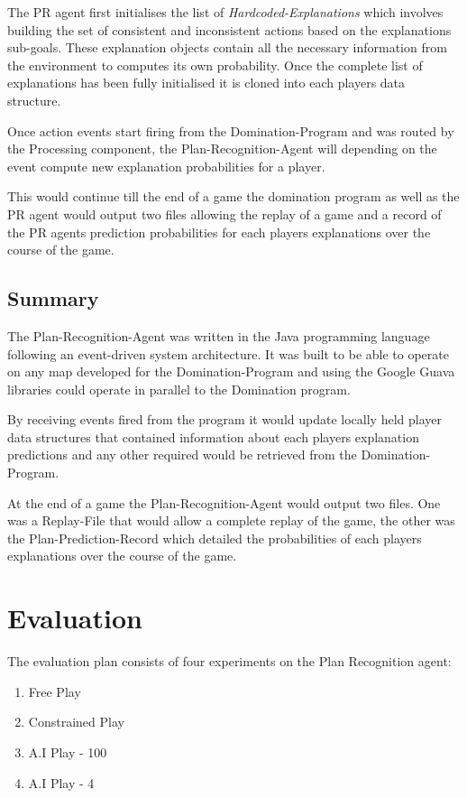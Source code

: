 \documentclass[parskip]{cs4rep}
\begin{document}
The PR agent first initialises the list of \textit{Hardcoded-Explanations} which involves building the set of consistent and inconsistent actions based on the explanations sub-goals. These explanation objects contain all the necessary information from the environment to computes its own probability. Once the complete list of explanations has been fully initialised it is cloned into each players data structure.

Once action events start firing from the Domination-Program and was routed by the Processing component, the Plan-Recognition-Agent will depending on the event compute new explanation probabilities for a player.

This would continue till the end of a game the domination program as well as the PR agent would output two files allowing the replay of a game and a record of the PR agents prediction probabilities for each players explanations over the course of the game.

\section{Summary}

The Plan-Recognition-Agent was written in the Java programming language following an event-driven system architecture. It was built to be able to operate on any map developed for the Domination-Program and using the Google Guava libraries could operate in parallel to the Domination program. 

By receiving events fired from the program it would update locally held player data structures that contained information about each players explanation predictions and any other required would be retrieved from the Domination-Program.

At the end of a game the Plan-Recognition-Agent would output two files. One was a Replay-File that would allow a complete replay of the game, the other was the Plan-Prediction-Record which detailed the probabilities of each players explanations over the course of the game.

\chapter{Evaluation}

The evaluation plan consists of four experiments on the Plan Recognition agent:

\begin{enumerate}
\item
Free Play
\item
Constrained Play
\item
A.I Play - 100
\item
A.I Play - 4
\end{enumerate}
\end{document}
